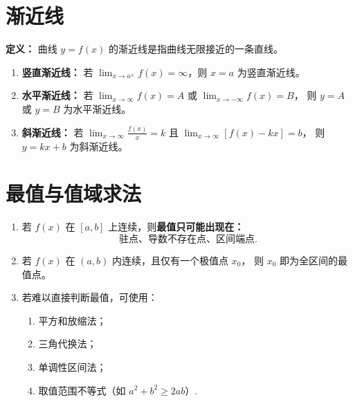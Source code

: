 \section{渐近线}

\textbf{定义：} 曲线 $y=f(x)$ 的渐近线是指曲线无限接近的一条直线。

\begin{enumerate}
    \item \textbf{竖直渐近线：}
          若 $\displaystyle \lim_{x\to a^\pm}f(x)=\infty$，则 $x=a$ 为竖直渐近线。

    \item \textbf{水平渐近线：}
          若 $\displaystyle \lim_{x\to\infty}f(x)=A$ 或 $\lim_{x\to-\infty}f(x)=B$，
          则 $y=A$ 或 $y=B$ 为水平渐近线。

    \item \textbf{斜渐近线：}
          若 $\displaystyle \lim_{x\to\infty}\frac{f(x)}{x}=k$ 且 $\lim_{x\to\infty}[f(x)-kx]=b$，
          则 $y=kx+b$ 为斜渐近线。
\end{enumerate}

\section{最值与值域求法}
\DTwoThree
\begin{enumerate}
    \item 若 $f(x)$ 在 $[a,b]$ 上连续，则\textbf{最值只可能出现在：}
          \[
              \text{驻点、导数不存在点、区间端点}.
          \]
    \item 若 $f(x)$ 在 $(a,b)$ 内连续，且仅有一个极值点 $x_0$，
          则 $x_0$ 即为全区间的最值点。
    \item 若难以直接判断最值，可使用：
          \begin{enumerate}
              \item 平方和放缩法；
              \item 三角代换法；
              \item 单调性区间法；
              \item 取值范围不等式（如 $a^2+b^2\ge2ab$）.
          \end{enumerate}
\end{enumerate}